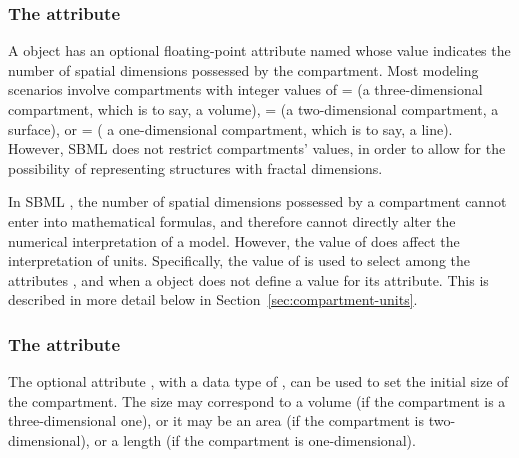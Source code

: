 \subsubsection{The  attribute}
\label{sec:compartment-spatialdimensions}

A \Compartment object has an optional floating-point attribute
named  whose value indicates the number
of spatial dimensions possessed by the compartment.  Most modeling
scenarios involve compartments with integer values of
= (\ie a three-dimensional
compartment, which is to say, a volume),
= (\ie a two-dimensional
compartment, a surface), or = (\ie
a one-dimensional compartment, which is to say, a line).  However,
SBML \thisL does not restrict compartments'
 values, in order to allow for the
possibility of representing structures with fractal dimensions.

In SBML \thisLV, the number of spatial dimensions possessed by a
compartment cannot enter into mathematical formulas, and therefore
cannot directly alter the numerical interpretation of a model.
However, the value of  does affect the
interpretation of units.  Specifically, the value of
 is used to select among the \Model
attributes ,  and
 when a \Compartment object does not define a
value for its  attribute.  This is described in more
detail below in Section~\ref{sec:compartment-units}.


\subsubsection{The  attribute}
\label{sec:compartment-size}
\label{sec:size}

The optional \Compartment attribute , with a data type
of , can be used to set the initial size of the
compartment.  The size may correspond to a volume (if the
compartment is a three-dimensional one), or it may be an area (if
the compartment is two-dimensional), or a length (if the
compartment is one-dimensional).

